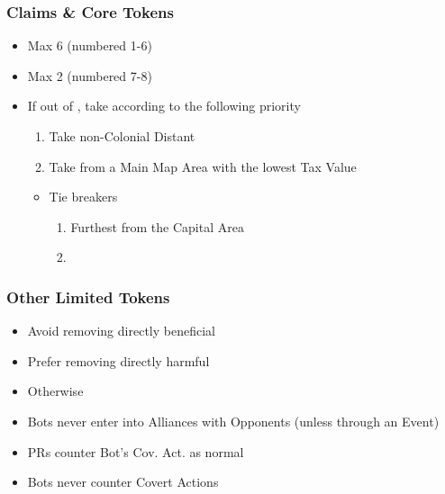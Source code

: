 \documentclass[10pt]{article}
\begin{document}
\subsubsection*{Claims \& Core Tokens}
\begin{itemize}
	\item Max 6 \claims (numbered 1-6)
	\item Max 2 \cores (numbered 7-8)
	\item If out of \claims, take according to the following priority
	\begin{enumerate}
		\item Take non-Colonial Distant \claims
		\item Take \claims from a Main Map Area with the lowest Tax Value
	\end{enumerate}
	\begin{itemize}
		\item Tie breakers
		\begin{enumerate}
			\item Furthest from the Capital Area
			\item \az
		\end{enumerate}
	\end{itemize}
\end{itemize}

\subsubsection*{Other Limited Tokens}
\begin{itemize}
	\item Avoid removing directly beneficial
	\item Prefer removing directly harmful
	\item Otherwise \az
\end{itemize}

\begin{itemize}
	\item Bots never enter into Alliances with Opponents (unless through an Event)
\end{itemize}

\begin{itemize}
	\item PRs counter Bot's Cov. Act. as normal
	\item Bots never counter Covert Actions 
\end{itemize}
\end{document}

